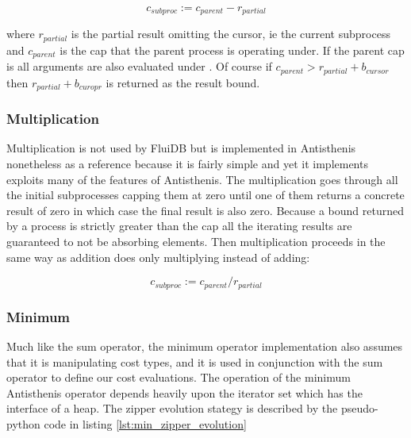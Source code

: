 \[
c_{subproc} := c_{parent} - r_{partial}
\]

where \(r_{partial}\) is the partial result omitting the cursor, ie
the current subprocess and \(c_{parent}\) is the cap that the parent
process is operating under. If the parent cap is  all
arguments are also evaluated under . Of course if
\(c_{parent} > r_{partial} + b_{cursor}\) then \(r_{partial} +
b_{curopr}\) is returned as the result bound.

\subsubsection{Multiplication}

Multiplication is not used by FluiDB but is implemented in Antisthenis
nonetheless as a reference because it is fairly simple and yet it
implements exploits many of the features of Antisthenis. The
multiplication goes through all the initial subprocesses capping them
at zero until one of them returns a concrete result of zero in which
case the final result is also zero. Because a bound returned by a
process is strictly greater than the cap all the iterating results are
guaranteed to not be absorbing elements. Then multiplication proceeds
in the same way as addition does only multiplying instead of adding:

\[
c_{subproc} := c_{parent} / r_{partial}
\]

\subsubsection{Minimum}

Much like the sum operator, the minimum operator implementation also
assumes that it is manipulating cost types, and it is used in
conjunction with the sum operator to define our cost evaluations. The
operation of the minimum Antisthenis operator depends heavily upon the
iterator set which has the interface of a heap. The zipper evolution
stategy is described by the pseudo-python code in listing
\ref{lst:min_zipper_evolution}

